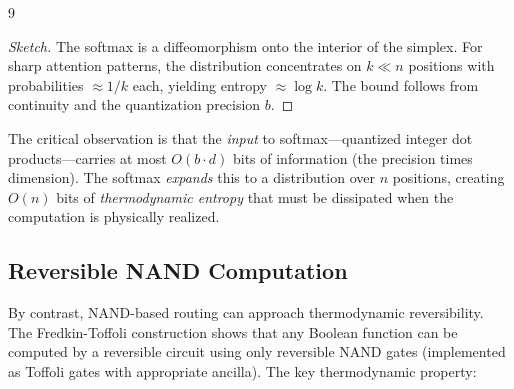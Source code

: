 \documentclass[11pt]{article}
\theoremstyle{definition}
\begin{document}
\begin{thebibliography}{9}
{{{\begin{proof}[Sketch]






The softmax is a diffeomorphism onto the interior of the simplex. For sharp attention patterns, the distribution concentrates on $k \ll n$ positions with probabilities $\approx 1/k$ each, yielding entropy $\approx \log k$. The bound follows from continuity and the quantization precision $b$.






\end{proof}













The critical observation is that the \emph{input} to softmax—quantized integer dot products—carries at most $O(b \cdot d)$ bits of information (the precision times dimension). The softmax \emph{expands} this to a distribution over $n$ positions, creating $O(n)$ bits of \emph{thermodynamic entropy} that must be dissipated when the computation is physically realized.













\subsection{Reversible NAND Computation}













By contrast, NAND-based routing can approach thermodynamic reversibility. The Fredkin-Toffoli construction \cite{fredkin1982} shows that any Boolean function can be computed by a reversible circuit using only reversible NAND gates (implemented as Toffoli gates with appropriate ancilla). The key thermodynamic property:













}}}
\end{thebibliography}
\end{document}
